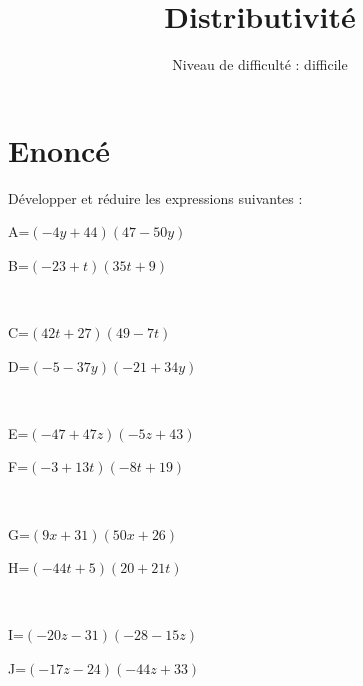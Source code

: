 \documentclass{article}%
\title{Distributivité}%
\author{Niveau de difficulté : difficile}%
\date{{}}%
\begin{document}
%
\normalsize%
\pagestyle{empty}%
\maketitle%
\section{Enoncé}%
\label{sec:Enonc}%
Développer et réduire les expressions suivantes :%
\newline%
%
\newline%
%
\begin{minipage}{0.5\textwidth}%
A=$(-4y+44)(47-50y)$\\%
\end{minipage}%
\begin{minipage}{0.5\textwidth}%
B=$(-23+t)(35t+9)$\\%
\end{minipage}%
\\%
\begin{minipage}{0.5\textwidth}%
C=$(42t+27)(49-7t)$\\%
\end{minipage}%
\begin{minipage}{0.5\textwidth}%
D=$(-5-37y)(-21+34y)$\\%
\end{minipage}%
\\%
\begin{minipage}{0.5\textwidth}%
E=$(-47+47z)(-5z+43)$\\%
\end{minipage}%
\begin{minipage}{0.5\textwidth}%
F=$(-3+13t)(-8t+19)$\\%
\end{minipage}%
\\%
\begin{minipage}{0.5\textwidth}%
G=$(9x+31)(50x+26)$\\%
\end{minipage}%
\begin{minipage}{0.5\textwidth}%
H=$(-44t+5)(20+21t)$\\%
\end{minipage}%
\\%
\begin{minipage}{0.5\textwidth}%
I=$(-20z-31)(-28-15z)$\\%
\end{minipage}%
\begin{minipage}{0.5\textwidth}%
J=$(-17z-24)(-44z+33)$\\%
\end{minipage}%
\end{document}

